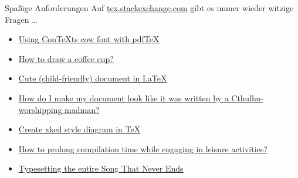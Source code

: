 \documentclass[
	vorläufig=false,
	datum=2022-12-22,
	titel={Witziges, Obskures und Sinnvolles…},
	web=false,
 	aspectratio=1610,
 	max,
]{../tex/latexkurs-slides}
\begin{document}
\begin{frame}{Spaßige Anforderungen}
	Auf \url{tex.stackexchange.com} gibt es immer wieder witzige Fragen …
	\begin{itemize}
		\item \href{http://tex.stackexchange.com/questions/115471/using-contexts-cow-font-with-pdftex}{Using ConTeXts cow font with pdfTeX}
		\item \href{http://tex.stackexchange.com/questions/145223/how-to-draw-a-coffee-cup}{How to draw a coffee cup?}
		\item \href{http://tex.stackexchange.com/questions/63732/cute-child-friendly-document-in-latex}{Cute (child-friendly) document in LaTeX}
		\item \href{http://tex.stackexchange.com/questions/29402/how-do-i-make-my-document-look-like-it-was-written-by-a-cthulhu-worshipping-madm}{How do I make my document look like it was written by a Cthulhu-worshipping madman?}
		\item \href{http://tex.stackexchange.com/questions/74878/create-xkcd-style-diagram-in-tex}{Create xkcd style diagram in TeX}
\item \href{https://tex.stackexchange.com/questions/122116/how-to-prolong-compilation-time-while-engaging-in-leisure-activities}{How to prolong compilation time while engaging in leisure activities?}
	\item \href{https://tex.stackexchange.com/questions/95783/typesetting-the-entire-song-that-never-ends}{Typesetting the entire Song That Never Ends}
	\end{itemize}
\end{frame}
\end{document}
